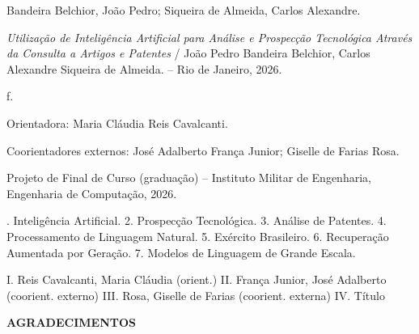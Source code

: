 \documentclass[12pt, a4paper]{article}
\begin{document}
\vfill

\begin{mdframed}[
  linewidth=0.8pt,
  innerleftmargin=12pt,
  innerrightmargin=12pt,
  innertopmargin=10pt,
  innerbottommargin=10pt
]
  \fontsize{11}{14}\selectfont

  Bandeira Belchior, João Pedro; Siqueira de Almeida, Carlos Alexandre.

  \vspace{4pt}
  \quad\textit{Utilização de Inteligência Artificial para Análise e Prospecção
  Tecnológica Através da Consulta a Artigos e Patentes} / João Pedro Bandeira
  Belchior, Carlos Alexandre Siqueira de Almeida. -- Rio de Janeiro, 2026.

  \vspace{4pt}
   f.

  \vspace{4pt}
\quad Orientadora: Maria Cláudia Reis Cavalcanti.

\vspace{4pt}
\quad Coorientadores externos: José Adalberto França Junior; Giselle de Farias Rosa.

\vspace{4pt}
\quad Projeto de Final de Curso (graduação) -- Instituto Militar de
Engenharia, Engenharia de Computação, 2026.

\vspace{4pt}
. Inteligência Artificial. 2. Prospecção Tecnológica. 3. Análise de
Patentes. 4. Processamento de Linguagem Natural. 5. Exército Brasileiro.
6. Recuperação Aumentada por Geração. 7. Modelos de Linguagem de Grande Escala.

\vspace{4pt}
\quad I. Reis Cavalcanti, Maria Cláudia (orient.) II. França Junior, José Adalberto (coorient. externo) III. Rosa, Giselle de Farias (coorient. externa) IV. Título

\end{mdframed}

\newpage

\begin{center}
  {\fontsize{12}{14}\selectfont\bfseries AGRADECIMENTOS}
\end{center}

\vspace{0.6cm}
\end{document}
